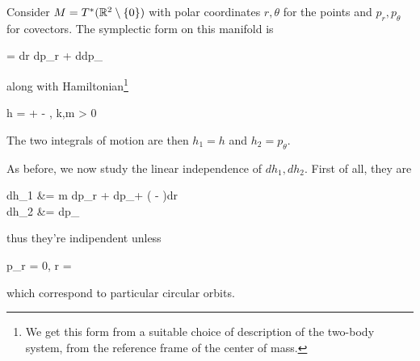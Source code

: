 \documentclass[main.tex]{subfiles}
\begin{document}
\begin{example}
	Consider $M= T^*(\mathbb{R}^2 \setminus \{0\})$ with polar coordinates $r, \theta$ for the points and $p_r, p_\theta$ for covectors. The symplectic form on this manifold is
	\begin{eqalign}
		\omega = dr \wedge dp_r + d\theta \wedge dp_\theta
	\end{eqalign}
	along with Hamiltonian\footnote{We get this form from a suitable choice of description of the two-body system, from the reference frame of the center of mass.}
	\begin{eqalign}
		h =  +  - , \quad k,m > 0
	\end{eqalign}
	The two integrals of motion are then $h_1=h$ and $h_2 = p_\theta$.

	As before, we now study the linear independence of $dh_1, dh_2$. First of all, they are
	\begin{eqalign}
		dh_1 &= m dp_r + dp_\theta + \left(  -  \right)dr\\
		dh_2 &= dp_\theta
	\end{eqalign}
	thus they're indipendent unless
	\begin{eqalign}
		p_r = 0, \quad r = \frac{p_\theta^2}{mk}
	\end{eqalign}
	which correspond to particular circular orbits.


\end{example}
\end{document}
